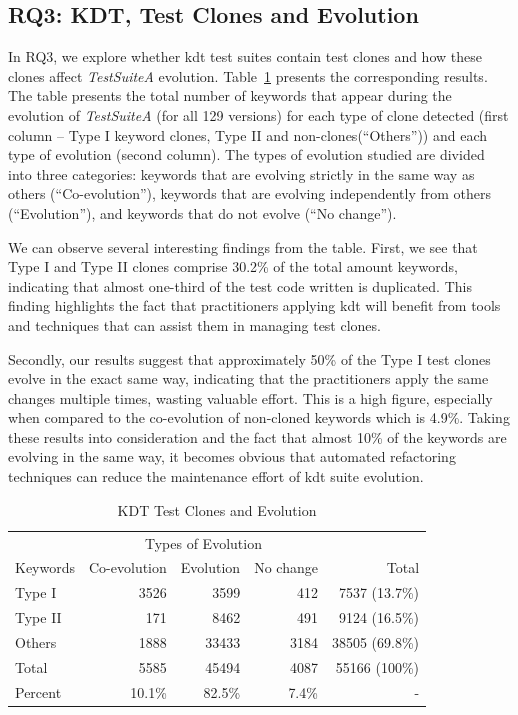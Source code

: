 \subsection{RQ3: KDT, Test Clones and Evolution}
\label{sec:evolution-results-rq3}

In RQ3, we explore whether \gls{kdt} test suites contain test clones and how these clones affect \emph{TestSuiteA} evolution. Table~\ref{table:co_evolution} presents the corresponding results. The table presents the total number of keywords that appear during the evolution of \emph{TestSuiteA} (for all 129 versions) for each type of clone detected (first column -- Type I keyword clones, Type II and non-clones(``Others'')) and each type of evolution (second column). The types of evolution studied are divided into three categories: keywords that are evolving strictly in the same way as others (``Co-evolution''), keywords that are evolving independently from others (``Evolution''), and keywords that do not evolve (``No change'').

We can observe several interesting findings from the table. First, we see that Type I and Type II clones comprise 30.2\% of the total amount keywords, indicating that almost one-third of the test code written is duplicated. This finding highlights the fact that practitioners applying \gls{kdt} will benefit from tools and techniques that can assist them in managing test clones.

Secondly, our results suggest that approximately 50\% of the Type I test clones evolve in the exact same way, indicating that the practitioners apply the same changes multiple times, wasting valuable effort. This is a high figure, especially when compared to the co-evolution of non-cloned keywords which is 4.9\%. Taking these results into consideration and the fact that almost 10\% of the keywords are evolving in the same way, it becomes obvious that automated refactoring techniques can reduce the maintenance effort of \gls{kdt} suite evolution.

\begin{table}
\caption{KDT Test Clones and Evolution}
\label{table:co_evolution}
\centering
\begin{tabular}{l|rrr|r}
  \toprule
         & \multicolumn{3}{c|}{Types of Evolution}                  \\
Keywords & Co-evolution &  Evolution &  No change &  Total          \\
\midrule
Type I  &          3526 &       3599 &        412 &   7537 (13.7\%) \\
Type II &           171 &       8462 &        491 &   9124 (16.5\%) \\  
Others  &          1888 &      33433 &       3184 &  38505 (69.8\%) \\
\midrule                                   
Total   &          5585 &      45494 &       4087 &  55166 (100\%)  \\ 
Percent &        10.1\% &     82.5\% &      7.4\% &    -            \\
\bottomrule
\end{tabular}
\end{table}

